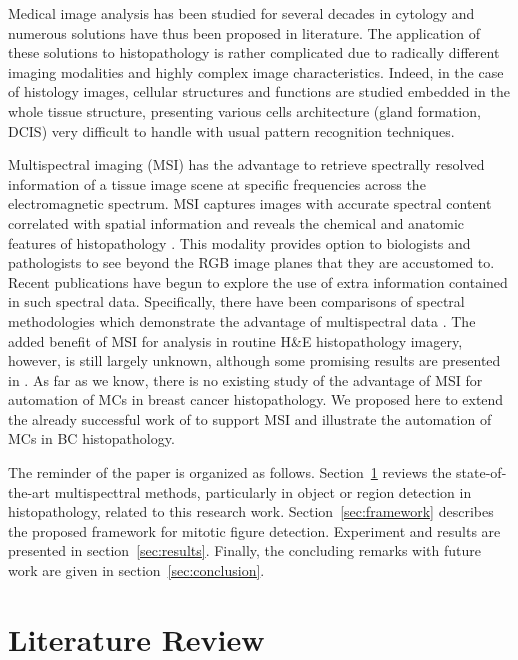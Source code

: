 \documentclass[10pt,twocolumn,letterpaper]{article}
\begin{document}
Medical image analysis has been studied for several decades in cytology and numerous solutions \cite{wolberg1993, stewart1998, cibas2009, plissiti2013, gong2013} have thus been proposed in literature. The application of these solutions to histopathology is rather complicated due to radically different imaging modalities and highly complex image characteristics. Indeed, in the case of histology images, cellular structures and functions are studied embedded in the whole tissue structure, presenting various cells architecture (gland formation, DCIS) very difficult to handle with usual pattern recognition techniques.
 
Multispectral imaging (MSI) has the advantage to retrieve spectrally resolved information of a tissue image scene at specific frequencies across the electromagnetic spectrum. MSI captures images with accurate spectral content correlated with spatial information and reveals the chemical and anatomic features of histopathology \cite{levenson2006b, levenson2008}. This modality provides option to biologists and pathologists to see beyond the RGB image planes that they are accustomed to. Recent publications \cite{fernandez2005, levenson2006, wu2012, khelifi2012} have begun to explore the use of extra information contained in such spectral data. Specifically, there have been comparisons of spectral methodologies which demonstrate the advantage of multispectral data \cite{levenson2003, gentry1999}. The added benefit of MSI for analysis in routine H\&E histopathology imagery, however, is still largely unknown, although some promising results are presented in \cite{roula2003, fernandez2005, khelifi2012, wu2012}. As far as we know, there is no existing study of the advantage of MSI for automation of MCs in breast cancer histopathology. We proposed here to extend the already successful work of \cite{irshad2013b} to support MSI and illustrate the automation of MCs in BC histopathology.

The reminder of the paper is organized as follows. Section~\ref{sec:previous} reviews the state-of-the-art multispecttral methods, particularly in object or region detection in histopathology, related to this research work. Section~\ref{sec:framework} describes the proposed framework for mitotic figure detection. Experiment and results are presented in section~\ref{sec:results}. Finally, the concluding remarks with future work are given in section~\ref{sec:conclusion}.

\section{Literature Review}
\label{sec:previous}
\end{document}
